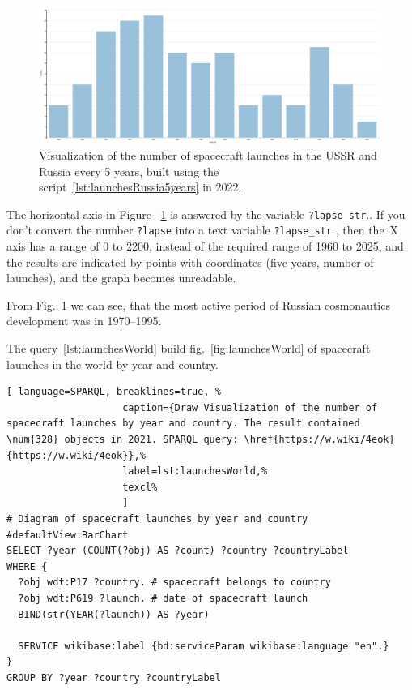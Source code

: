 \begin{figure}[h!]
  \includegraphics[width=\linewidth]{graphics/chapter/spacecraft/Visualization of the number of spacecraft launches in USSR and Russia per 5 years 2022.png}
  \caption[Schedule of spacecraft launches in the USSR and Russia (by five years)] {Visualization of the number of spacecraft launches in the USSR and Russia every 5 years, built using the script~\protect\ref{lst:launchesRussia5years} in 2022.}%
  \label{fig:launchesRussia5years}%
\end{figure}

The horizontal axis in Figure ~\ref{fig:launchesRussia5years} is answered by the variable \mbox{\lstinline|?lapse_str|.}. 
If you don't convert the number \lstinline|?lapse| 
into a text variable \mbox{\lstinline|?lapse_str|}%
, then the~X axis has a range of 0 to 2200, 
instead of the required range of 1960 to 2025, 
and the results are indicated by points with coordinates (five years, number of launches), 
and the graph becomes unreadable. 

From Fig.~\ref{fig:launchesRussia5years} we can see, 
that the most active period of Russian cosmonautics development was in 1970--1995.

The query~\ref{lst:launchesWorld} build fig.~\ref{fig:launchesWorld} 
of spacecraft launches in the world by year and country.

\begin{lstlisting}[ language=SPARQL, breaklines=true, %
                    caption={Draw Visualization of the number of spacecraft launches by year and country. The result contained \num{328} objects in 2021. SPARQL query: \href{https://w.wiki/4eok}{https://w.wiki/4eok}},%
                    label=lst:launchesWorld,%
                    texcl%
                    ]
# Diagram of spacecraft launches by year and country
#defaultView:BarChart
SELECT ?year (COUNT(?obj) AS ?count) ?country ?countryLabel
WHERE {
  ?obj wdt:P17 ?country. # spacecraft belongs to country 
  ?obj wdt:P619 ?launch. # date of spacecraft launch
  BIND(str(YEAR(?launch)) AS ?year)
  
  SERVICE wikibase:label {bd:serviceParam wikibase:language "en".}
}
GROUP BY ?year ?country ?countryLabel
\end{lstlisting}%

